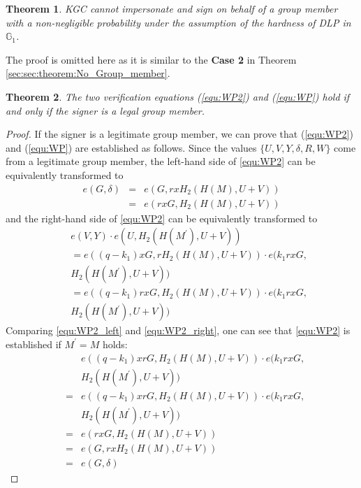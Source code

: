 \documentclass[letterpaper,12pt]{article}
\newtheorem{theorem}{Theorem}
\begin{document}
\begin{theorem}\label{sec:sec:theorem:KGC_fake_signature}
 KGC cannot impersonate and sign on behalf of a group member with a non-negligible probability under the assumption of the hardness of DLP in $\mathbb{G}_1$.
\end{theorem}

The proof is omitted here as it is similar to the \textbf{Case 2} in Theorem \ref{sec:sec:theorem:No_Group_member}.

\begin{theorem} \label{sec:sec:theorem:verification}
The two verification equations (\ref{equ:WP2}) and (\ref{equ:WP}) hold if and only if the signer is a legal group member.
\end{theorem}
%
\begin{proof} If the signer is a legitimate group member, we can prove that  (\ref{equ:WP2}) and (\ref{equ:WP}) are established as follows. Since the values $\{U, V, Y, \delta, R, W\}$ come from a legitimate group member, the left-hand side of \eqref{equ:WP2} can be equivalently transformed to
%
\begin{eqnarray}\label{equ:WP2_left}
e(G,\delta)&=&e(G, rxH_2(H(M), U+V)) \nonumber\\
&=&e(rx G, H_2(H(M), U+V))
\end{eqnarray}
%
and the right-hand side of \eqref{equ:WP2} can be equivalently transformed to
\begin{eqnarray} \label{equ:WP2_right}
&&e(V, Y)\cdot e(U, H_2(H(M^\prime), U+V)) \nonumber\\
&&=e((q-k_1)x G, rH_2(H(M), U+V))\cdot e(k_1rx G, \nonumber\\
&&H_2(H(M^\prime),U+V)) \nonumber\\
&&=e((q-k_1)rx G, H_2(H(M), U+V))\cdot e(k_1rx G, \nonumber\\
&&H_2(H(M^\prime), U+V))
\end{eqnarray}
%
Comparing  \eqref{equ:WP2_left} and \eqref{equ:WP2_right}, one can see that  \eqref{equ:WP2} is established if $M^\prime=M$ holds:
%
\begin{eqnarray*}
&&e((q-k_1)xr G, H_2(H(M), U+V))\cdot e(k_1rx G, \\
&&H_2(H(M^\prime), U+V)) \\
&=&e((q-k_1)xr G, H_2(H(M), U+V))\cdot e(k_1rx G,\\
&&H_2(H(M^\prime), U+V))\\
&=&e(rxG, H_2(H(M), U+V))\\
&=&e(G,rxH_2(H(M), U+V))\\
&=&e(G,\delta)
\end{eqnarray*}


\end{proof}
\end{document}
